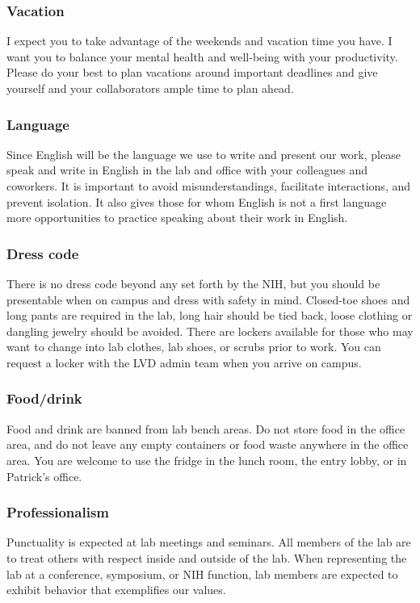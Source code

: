\documentclass[10pt, letterpaper, twocolumn]{article} %
\begin{document}
\subsubsection{Vacation} I expect you to take advantage of the weekends and vacation time you have. I want you to balance your mental health and well-being with your productivity. Please do your best to plan vacations around important deadlines and give yourself and your collaborators ample time to plan ahead.

\subsubsection{Language}
Since English will be the language we use to write and present our work, please speak and write in English in the lab and office with your colleagues and coworkers. It is important to avoid misunderstandings, facilitate interactions, and prevent isolation. It also gives those for whom English is not a first language more opportunities to practice speaking about their work in English.

\subsubsection{Dress code} There is no dress code beyond any set forth by the NIH, but you should be presentable when on campus and dress with safety in mind. Closed-toe shoes and long pants are required in the lab, long hair should be tied back, loose clothing or dangling jewelry should be avoided. There are lockers available for those who may want to change into lab clothes, lab shoes, or scrubs prior to work. You can request a locker with the LVD admin team when you arrive on campus.

\subsubsection{Food/drink} Food and drink are banned from lab bench areas. Do not store food in the office area, and do not leave any empty containers or food waste anywhere in the office area. You are welcome to use the fridge in the lunch room, the entry lobby, or in Patrick's office.

\subsubsection{Professionalism}
Punctuality is expected at lab meetings and seminars. All members of the lab are to treat others with respect inside and outside of the lab. When representing the lab at a conference, symposium, or NIH function, lab members are expected to exhibit behavior that exemplifies our values.
\end{document}
